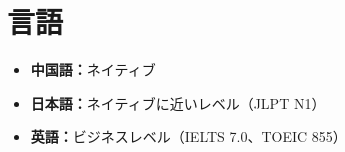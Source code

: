 \documentclass[a4paper,10pt]{article}
\begin{document}
\section{言語}
\begin{itemize}
  \item {\gtfamily\bfseries 中国語：}ネイティブ
  \item {\gtfamily\bfseries 日本語：}ネイティブに近いレベル（JLPT N1）
  \item {\gtfamily\bfseries 英語：}ビジネスレベル（IELTS 7.0、TOEIC 855）
\end{itemize}
\end{document}
